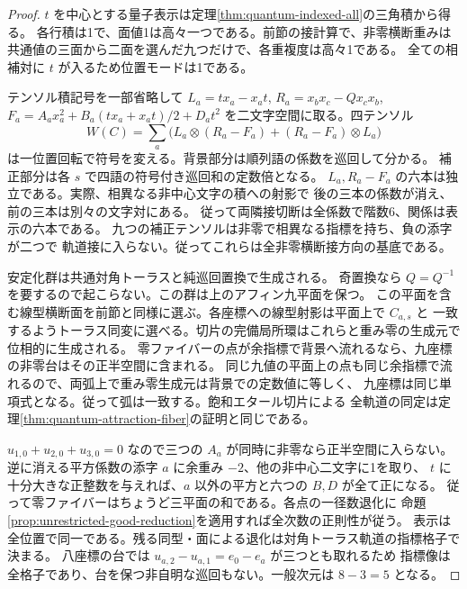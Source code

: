 \begin{proof}
$t$ を中心とする量子表示は定理\ref{thm:quantum-indexed-all}の三角積から得る。
各行積は1で、面値1は高々一つである。前節の接計算で、非零横断重みは
共通値の三面から二面を選んだ九つだけで、各重複度は高々1である。
全ての相補対に $t$ が入るため位置モードは1である。

テンソル積記号を一部省略して $L_a=t x_a-x_a t$, $R_a=x_bx_c-Qx_cx_b$,
$F_a=A_ax_a^2+B_a(t x_a+x_a t)/2+D_at^2$ を二文字空間に取る。四テンソル
\[
 W(C)=\sum_a \bigl(L_a\otimes(R_a-F_a)+(R_a-F_a)\otimes L_a\bigr)
\]
は一位置回転で符号を変える。背景部分は順列語の係数を巡回して分かる。
補正部分は各 $s$ で四語の符号付き巡回和の定数倍となる。
$L_a,R_a-F_a$ の六本は独立である。実際、相異なる非中心文字の積への射影で
後の三本の係数が消え、前の三本は別々の文字対にある。
従って両隣接切断は全係数で階数6、関係は表示の六本である。
九つの補正テンソルは非零で相異なる指標を持ち、負の添字が二つで
軌道接に入らない。従ってこれらは全非零横断接方向の基底である。

安定化群は共通対角トーラスと純巡回置換で生成される。
奇置換なら $Q=Q^{-1}$ を要するので起こらない。この群は上のアフィン九平面を保つ。
この平面を含む線型横断面を前節と同様に選ぶ。各座標への線型射影は平面上で $C_{a,s}$ と
一致するようトーラス同変に選べる。切片の完備局所環はこれらと重み零の生成元で位相的に生成される。
零ファイバーの点が余指標で背景へ流れるなら、九座標の非零台はその正半空間に含まれる。
同じ九値の平面上の点も同じ余指標で流れるので、両弧上で重み零生成元は背景での定数値に等しく、
九座標は同じ単項式となる。従って弧は一致する。飽和エタール切片による
全軌道の同定は定理\ref{thm:quantum-attraction-fiber}の証明と同じである。

$u_{1,0}+u_{2,0}+u_{3,0}=0$ なので三つの $A_a$ が同時に非零なら正半空間に入らない。
逆に消える平方係数の添字 $a$ に余重み $-2$、他の非中心二文字に1を取り、
$t$ に十分大きな正整数を与えれば、$a$ 以外の平方と六つの $B,D$ が全て正になる。
従って零ファイバーはちょうど三平面の和である。各点の一径数退化に
命題\ref{prop:unrestricted-good-reduction}を適用すれば全次数の正則性が従う。
表示は全位置で同一である。残る同型・面による退化は対角トーラス軌道の指標格子で決まる。
八座標の台では $u_{a,2}-u_{a,1}=e_0-e_a$ が三つとも取れるため
指標像は全格子であり、台を保つ非自明な巡回もない。一般次元は $8-3=5$ となる。
\end{proof}

